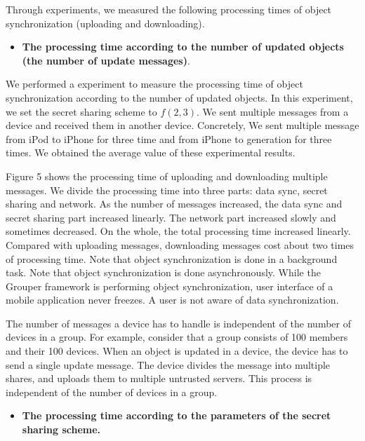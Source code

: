\documentclass[twocolumn,10pt]{article}
\begin{document}
Through experiments, we measured the following processing times of object synchronization (uploading and downloading).

\begin{itemize}[leftmargin=*]
	\setlength{\itemsep}{1pt}
	\setlength{\parskip}{0pt}
	\setlength{\parsep}{0pt}
	\item \textbf{The processing time according to the number of updated objects (the number of update messages)}.
\end{itemize}

We performed a experiment to measure the processing time of object synchronization according to the number of updated objects.
In this experiment, we set the secret sharing scheme to ${f(2, 3)}$.
We sent multiple messages from a device and received them in another device. 
Concretely, We sent multiple message from iPod to iPhone for three time and from iPhone to generation for three times.
We obtained the average value of these experimental results.

Figure 5 shows the processing time of uploading and downloading multiple messages.
We divide the processing time into three parts: data sync, secret sharing and network.
As the number of messages increased, the data sync and secret sharing part increased linearly. 
The network part increased slowly and sometimes decreased.
On the whole, the total processing time increased linearly.
Compared with uploading messages, downloading messages cost about two times of processing time.
Note that object synchronization is done in a background task.
Note that object synchronization is done asynchronously.
While the Grouper framework is performing object synchronization, user interface of a mobile application never freezes.
A user is not aware of data synchronization.

The number of messages a device has to handle is independent of the number of devices in a group.
For example, consider that a group consists of 100 members and their 100 devices.
When an object is updated in a device, the device has to send a single update message.
The device divides the message into multiple shares, and uploads them to multiple untrusted servers.
This process is independent of the number of devices in a group. 

\begin{itemize}[leftmargin=*]
	\setlength{\itemsep}{1pt}
	\setlength{\parskip}{0pt}
	\setlength{\parsep}{0pt}
	\item \textbf{The processing time according to the parameters of the secret sharing scheme.}
\end{itemize}
\end{document}
